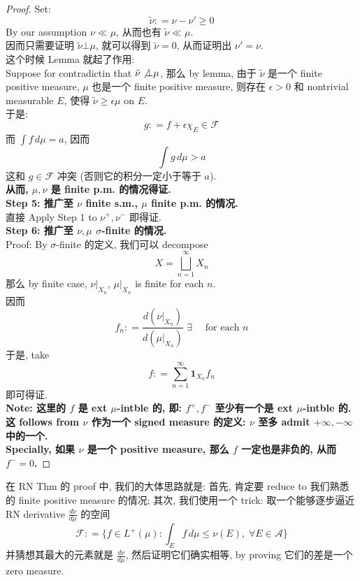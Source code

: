 \documentclass[lang=cn,11pt]{elegantbook}
\begin{document}
\begin{proof}
Set: \[
\tilde{\nu} : = \nu - \nu' \geq 0
\]By our assumption $\nu \ll\mu$, 从而也有  $\tilde{\nu} \ll \mu $.\\
因而只需要证明 $\tilde{\nu} \bot \mu$, 就可以得到 $\tilde{\nu} = 0$, 从而证明出 $\nu' = \nu$.\\
这个时候 Lemma 就起了作用: \\
Suppose for contradictin that $\tilde{\nu} \not \bot \mu$, 那么 by lemma, 由于 $\tilde{\nu}$ 是一个 finite positive measure, $\mu$ 也是一个 finite positive measure, 则存在 $\epsilon >0$ 和 nontrivial measurable $E$, 使得 $\tilde{\nu} \geq \epsilon \mu$ on $E$.\\
于是: \[
g: = f + \epsilon \chi_E \in \mathcal{F}
\]
而 $\int  f \,d\mu = a$, 因而 \[
\int g \, d\mu > a
\]这和 $g \in \mathcal{F}$ 冲突 (否则它的积分一定小于等于 $a$).\\
\textbf{从而, $\mu,\nu$ 是 finite p.m. 的情况得证.}\\
\textbf{Step 5: 推广至 $\nu$ finite s.m., $\mu$ finite p.m. 的情况.}\\
直接 Apply Step 1 to $\nu^+,\nu^-$ 即得证.\\
\textbf{Step 6: 推广至 $\nu,\mu$ $\sigma$-finite 的情况.}\\
 Proof: By $\sigma$-finite 的定义, 我们可以 decompose \[
 X = \bigsqcup_{n=1}^\infty X_n
 \]
 那么 by finite case, $\nu |_{X_n}$, $\mu|_{X_n}$ is finite for each $n$.\\
 因而 \[
f_n : =  \frac{d(\nu |_{X_n})}{d(\mu |_{X_n})}  \,\, \exists\quad  \text{ for each } n
 \]
 于是, take \[
 f: = \sum_{n=1}^\infty \mathbf{1}_{X_n} f_n
 \]即可得证. \\
\textbf{ Note: 这里的 $f$ 是 ext $\mu$-intble 的, 即: $f^+, f^-$ 至少有一个是 ext $\mu$-intble 的. 这 follows from $\nu$ 作为一个 signed measure 的定义: $\nu$ 至多 admit $+\infty,-\infty$ 中的一个.\\
 Specially, 如果 $\nu$ 是一个 positive measure, 那么 $f$ 一定也是非负的, 从而 $f^- = 0 $.}
\end{proof}

\begin{remark}
    在 RN Thm 的 proof 中, 我们的大体思路就是: 首先, 肯定要 reduce to 我们熟悉的 finite positive measure 的情况; 其次, 我们使用一个 trick: 取一个能够逐步逼近 RN derivative $\frac{d\nu}{d\mu}$ 的空间\[
   \mathcal{F} : = \bigg\{ f \in L^+(\mu) : \int_E f\, d\mu \leq \nu(E),\;\forall    E \in \mathcal{A} \bigg\}
   \]并猜想其最大的元素就是 $\frac{d\nu}{d\mu}$, 然后证明它们确实相等, by proving 它们的差是一个 zero measure.
\end{remark}
\end{document}
